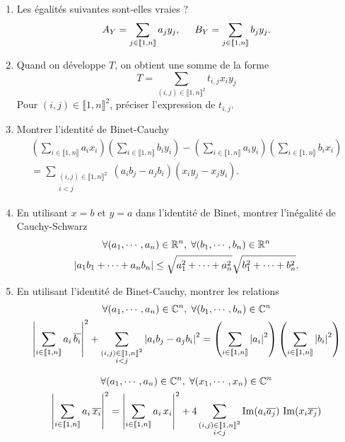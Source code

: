 \begin{enumerate}
 \item Les égalités suivantes sont-elles vraies ?
\[
 A_Y = \sum_{j \in \llbracket 1,n\rrbracket} a_j y_j, \hspace{0.5cm} 
 B_Y = \sum_{j \in \llbracket 1,n\rrbracket} b_j y_j .
\]

 \item Quand on développe $T$, on obtient une somme de la forme
\[
 T = \sum_{(i,j)\in \llbracket 1,n \rrbracket^2}t_{i,j}x_iy_j
\]
Pour $(i,j)\in \llbracket 1,n \rrbracket^2$, préciser l'expression de $t_{i,j}$.

 \item Montrer l'identité de Binet-Cauchy
\begin{multline}
 \left( \sum_{i \in \llbracket 1,n\rrbracket} a_i x_i\right)\left( \sum_{i \in \llbracket 1,n\rrbracket} b_i y_i\right) 
 - \left( \sum_{i \in \llbracket 1,n\rrbracket} a_i y_i\right)\left( \sum_{i \in \llbracket 1,n\rrbracket} b_i x_i\right) \\
 = 
 \sum_{\substack{(i,j)\in \llbracket 1,n \rrbracket^2 \\ i < j}}(a_ib_j-a_jb_i)(x_i y_j - x_jy_i).
\end{multline}

 \item En utilisant $x=b$ et $y=a$ dans l'identité de Binet, montrer l'inégalité de Cauchy-Schwarz
\begin{multline}
 \forall (a_1,\cdots, a_n)\in \mathbb{R}^n,\; \forall (b_1,\cdots, b_n)\in \mathbb{R}^n \\
 \left|a_1b_1 + \dots + a_n b_n\right| \leq
 \sqrt{a_1^2 + \cdots + a_n^2} \sqrt{b_1^2 + \cdots + b_n^2}.
\end{multline}

 \item En utilisant l'identité de Binet-Cauchy, montrer les relations
\begin{multline}
 \forall (a_1,\cdots, a_n) \in \mathbb{C}^n,\; \forall (b_1,\cdots, b_n) \in \mathbb{C}^n \\
 \left| \sum_{i \in \llbracket 1,n \rrbracket} a_i\, \overline{b_i} \right|^2 
 + \sum_{\substack{(i,j) \in \llbracket 1,n \rrbracket^2 \\ i < j}} \left| a_i b_j - a_jb_i\right|^2
 = \left( \sum_{i \in \llbracket 1,n \rrbracket} \left| a_i\right|^2\right) \left( \sum_{i \in \llbracket 1,n \rrbracket} \left| b_i\right|^2 \right)
\end{multline}

\begin{multline}
 \forall (a_1,\cdots, a_n)\in \mathbb{C}^n,\; \forall (x_1,\cdots, x_n) \in \mathbb{C}^n \\
 \left| \sum_{i \in \llbracket 1,n \rrbracket} a_i\, \overline{x_i} \right|^2 
 = \left| \sum_{i \in \llbracket 1,n \rrbracket} a_i\,x_i \right|^2
 + 4 \sum_{\substack{(i,j) \in \llbracket 1,n \rrbracket^2 \\ i < j}} \operatorname{Im}(a_i \overline{a_j})\, \operatorname{Im}(x_i \overline{x_j})
\end{multline}

\end{enumerate}
